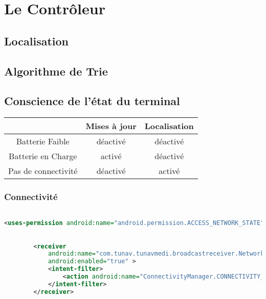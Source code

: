 \section{Le Contrôleur}

\subsection{Localisation}

\subsection{Algorithme de Trie}

\subsection{Conscience de l'état du terminal}

\begin{table}[H]
\centering
\begin{tabular}{|c|c|c|}
\hline
&\textsf{Mises à jour} & \textsf{Localisation}\\
\hline
\textsf{Batterie Faible} & déactivé & déactivé\\
\hline
\textsf{Batterie en Charge} & activé & déactivé\\
\hline
\textsf{Pas de connectivité} & déactivé & activé\\
\hline
\end{tabular}
\end{table}
\subsubsection{Connectivité}

\begin{lstlisting}[language=xml, caption=Permission d’accès à l’état des interfaces réseaux.]

<uses-permission android:name="android.permission.ACCESS_NETWORK_STATE" />

\end{lstlisting}

\begin{lstlisting}[language=xml, caption=Enregistrement du  NetworkReceiver aux événements liée au status des interfaces réseaux.]

        <receiver
            android:name="com.tunav.tunavmedi.broadcastreceiver.NetworkReceiver"
            android:enabled="true" >
            <intent-filter>
                <action android:name="ConnectivityManager.CONNECTIVITY_ACTION" />
            </intent-filter>
        </receiver>

\end{lstlisting}

